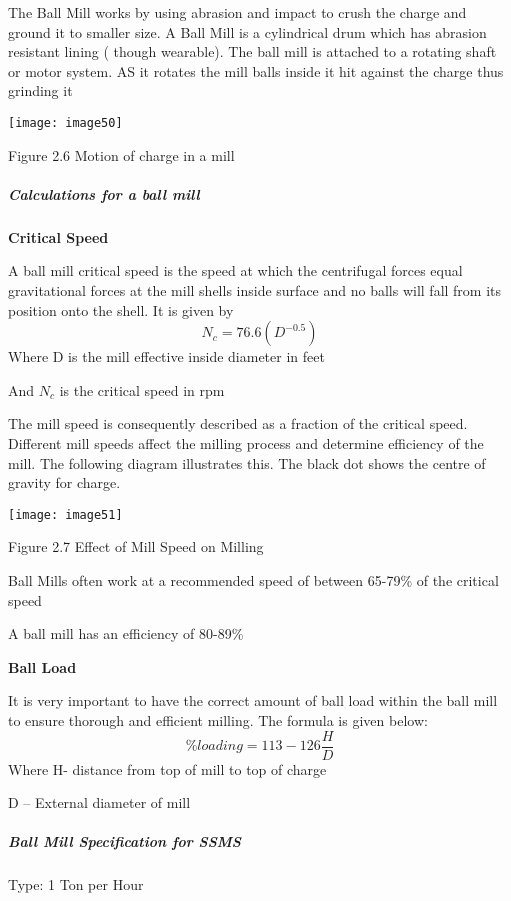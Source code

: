 \noindent The Ball Mill works by using abrasion and impact to crush the charge and ground it to smaller size. A Ball Mill is a cylindrical drum which has abrasion resistant lining ( though wearable). The ball mill is attached to a rotating shaft or motor system. AS it rotates the mill balls inside it hit against the charge thus grinding it\par

\noindent \texttt{[image: image50]}

\noindent Figure 2.6 Motion of charge in a mill 


\subparagraph{ Calculations for a ball mill}


{\bf  Critical Speed}

\noindent A ball mill critical speed is the speed at which the centrifugal forces equal gravitational forces at the mill shells inside surface and no balls will fall from its position onto the shell. It is given by
\[N_c=76.6(D^{-0.5})\] 
Where D is the mill effective inside diameter in feet

\noindent And $N_c$ is the critical speed in rpm

\noindent The mill speed is consequently described as a fraction of the critical speed. Different mill speeds affect the milling process and determine efficiency of the mill. The following diagram illustrates this. The black dot shows the centre of gravity for charge.\par

\noindent \texttt{[image: image51]}

\noindent Figure 2.7 Effect of Mill Speed on Milling

\noindent Ball Mills often work at a recommended speed of between 65-79\% of the critical speed

\noindent A ball mill has an efficiency of 80-89\%


{\bf  Ball Load}

\noindent It is very important to have the correct amount of ball load within the ball mill to ensure thorough and efficient milling. The formula is given below:
\[\%loading=113-126\frac{H}{D}\] 
Where H- distance from top of mill to top of charge

\noindent D -- External diameter of mill


\subparagraph{ Ball Mill Specification for SSMS}

\noindent Type: 1 Ton per Hour

